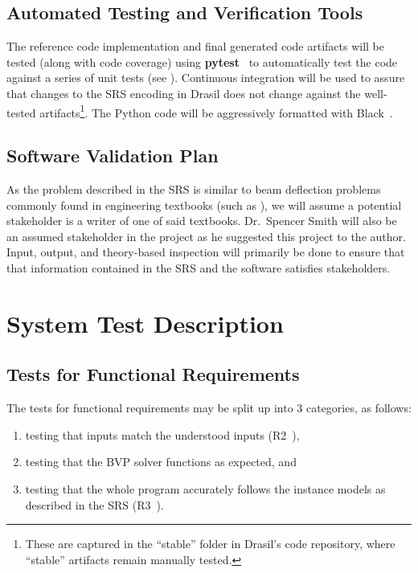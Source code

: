 \documentclass[12pt, titlepage]{article}
\begin{document}
\subsection{Automated Testing and Verification Tools}

The reference code implementation and final generated code artifacts will be
tested (along with code coverage) using \textbf{pytest}~\cite{PyTest} to
automatically test the code against a series of unit tests (see
). Continuous integration will be used to assure
that changes to the SRS encoding in Drasil does not change against the
well-tested artifacts\footnote{These are captured in the ``stable'' folder in
    Drasil's code repository, where ``stable'' artifacts remain manually tested.}.
The Python code will be aggressively formatted with Black~\cite{PythonBlack}.

\subsection{Software Validation Plan}

As the problem described in the SRS is similar to beam deflection problems
commonly found in engineering textbooks (such as \cite{BeerJohnston1981}), we
will assume a potential stakeholder is a writer of one of said textbooks.
Dr.~Spencer Smith will also be an assumed stakeholder in the project as he
suggested this project to the author. Input, output, and theory-based inspection
will primarily be done to ensure that that information contained in the SRS and
the software satisfies stakeholders.

\newpage{}

\section{System Test Description}

\subsection{Tests for Functional Requirements}

The tests for functional requirements may be split up into 3 categories, as
follows:

\begin{enumerate}
    
    \item testing that inputs match the understood inputs
          (R2~\cite{BalaciBeamBendingSRS2023}),

    \item testing that the BVP solver functions as expected, and
    
    \item testing that the whole program accurately follows the instance models
          as described in the SRS (R3~\cite{BalaciBeamBendingSRS2023}).
    
\end{enumerate}
\end{document}
